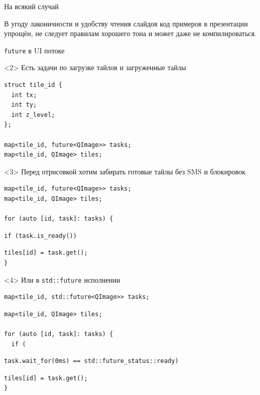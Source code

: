 \documentclass[aspectratio=169,pdf,hyperref={unicode},17pt]{beamer}
\begin{document}
\begin{frame}[t]{На всякий случай}

В угоду лаконичности и удобству чтения слайдов код примеров в презентации упрощён, не следует правилам хорошего тона и
может даже не компилироваться.
\end{frame}

\begin{frame}[fragile,t]{\texttt{future} в UI потоке}
\begin{onlyenv}<2>
Есть задачи по загрузке тайлов и загруженные тайлы

 \begin{lstlisting}[style=cppcode]
struct tile_id {
  int tx;
  int ty;
  int z_level;
};

map<tile_id, future<QImage>> tasks;
map<tile_id, QImage> tiles;
 \end{lstlisting}
\end{onlyenv}
\begin{onlyenv}<3>
Перед отрисовкой хотим забирать готовые тайлы без SMS и блокировок
 \begin{lstlisting}[style=cppcode,aboveskip=0pt,belowskip=0pt]
map<tile_id, future<QImage>> tasks;
map<tile_id, QImage> tiles;

for (auto [id, task]: tasks) {
\end{lstlisting}
\begin{lstlisting}[style=cppcode,backgroundcolor=\color{gray!30},aboveskip=0pt,belowskip=0pt]
  if (task.is_ready())
\end{lstlisting}
\begin{lstlisting}[style=cppcode,aboveskip=0pt,belowskip=0pt]
    tiles[id] = task.get();
}
 \end{lstlisting}
\end{onlyenv}
\begin{onlyenv}<4>
Или в \texttt{std::future} исполнении
 \begin{lstlisting}[style=cppcode,backgroundcolor=\color{gray!30},aboveskip=0pt,belowskip=0pt]
map<tile_id, std::future<QImage>> tasks;
\end{lstlisting}
\begin{lstlisting}[style=cppcode,aboveskip=0pt,belowskip=0pt]
map<tile_id, QImage> tiles;

for (auto [id, task]: tasks) {
  if (
\end{lstlisting}
\begin{lstlisting}[style=cppcode,backgroundcolor=\color{gray!30},aboveskip=0pt,belowskip=0pt]
    task.wait_for(0ms) == std::future_status::ready)
\end{lstlisting}
\begin{lstlisting}[style=cppcode,aboveskip=0pt,belowskip=0pt]
    tiles[id] = task.get();
}
 \end{lstlisting}
\end{onlyenv}
\end{frame}
\end{document}
